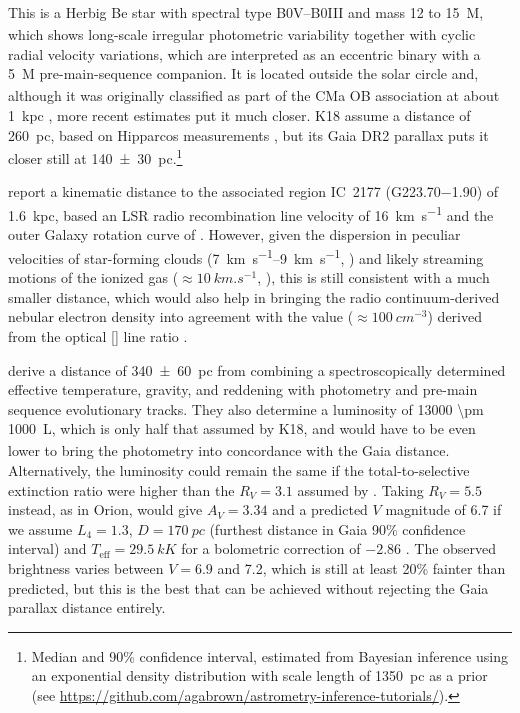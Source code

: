 This is a Herbig Be star with spectral type B0V--B0III and mass 12 to
\SI{15}{M_\odot}, which shows long-scale irregular photometric
variability \citep{Tjin-A-Djie:2001a, Pogodin:2006a} together with
cyclic radial velocity variations, which are interpreted as an
eccentric binary with a \SI{5}{M_\odot} pre-main-sequence companion.
It is located outside the solar circle and, although it was originally
classified as part of the CMa OB association at about \SI{1}{kpc}
\citep{Tjin-A-Djie:2001a}, more recent estimates put it much closer.
K18 assume a distance of \SI{260}{pc}, based on Hipparcos measurements
\citep{van-Leeuwen:2007a}, but its Gaia DR2 parallax
\citep{Gaia-Collaboration:2016a, Gaia-Collaboration:2018a, Luri:2018a}
puts it closer still at \SI{140 \pm 30}{pc}.\footnote{%
  Median and 90\% confidence interval, estimated from Bayesian
  inference using an exponential density distribution with scale
  length of \SI{1350}{pc} as a prior (see
  \url{https://github.com/agabrown/astrometry-inference-tutorials/}). }

\citet{Quireza:2006b} report a kinematic distance to the associated
\hii{} region IC~2177 (G\num{223.70}\num{-1.90}) of \SI{1.6}{kpc},
based an LSR radio recombination line velocity of \SI{+16}{km.s^{-1}}
\citep{Quireza:2006a} and the outer Galaxy rotation curve of
\citet{Brand:1993a}.  However, given the dispersion in peculiar
velocities of star-forming clouds (\SIrange{7}{9}{km.s^{-1}},
\citealp{Stark:1984a}) and likely streaming motions of the ionized gas
(\(\approx \SI{10}{km.s^{-1}}\), \citealp{Matzner:2002a, Lee:2012a}),
this is still consistent with a much smaller distance, which would
also help in bringing the radio continuum-derived nebular electron
density into agreement with the value (\(\approx \SI{100}{cm^{-3}}\))
derived from the optical [] line ratio
\citep{Hawley:1978a}.

\citet{Fairlamb:2015a} derive a distance of \SI{340 \pm 60}{pc} from
combining a spectroscopically determined effective temperature,
gravity, and reddening with photometry and pre-main sequence
evolutionary tracks.  They also determine a luminosity of \SI{13000
  \pm 1000}{L_\odot}, which is only half that assumed by K18, and
would have to be even lower to bring the photometry into concordance
with the Gaia distance.  Alternatively, the luminosity could remain
the same if the total-to-selective extinction ratio were higher than
the \(R_V = 3.1\) assumed by \citet{Fairlamb:2015a}.  Taking
\(R_V = 5.5\) instead, as in Orion, would give \(A_V = 3.34\) and a
predicted \(V\) magnitude of 6.7 if we assume \(L_4 = 1.3\),
\(D = \SI{170}{pc}\) (furthest distance in Gaia 90\% confidence
interval) and \(T_{\text{eff}} = \SI{29.5}{kK}\)
\citep{Fairlamb:2015a} for a bolometric correction of \(-2.86\)
\citep{Nieva:2013a}.  The observed brightness varies between
\(V = 6.9\) and 7.2, which is still at least 20\% fainter than
predicted, but this is the best that can be achieved without rejecting
the Gaia parallax distance entirely.

